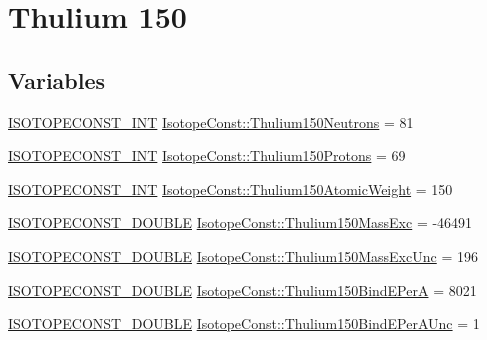 \hypertarget{group___isotope_const-_thulium-_tm150}{}\section{Thulium 150}
\label{group___isotope_const-_thulium-_tm150}
\subsection*{Variables}
\begin{DoxyCompactItemize}
\item 
\mbox{\hyperlink{group___isotope_const-_macros_ga5f18360b3e99483a35c32d789e62621c}{I\+S\+O\+T\+O\+P\+E\+C\+O\+N\+S\+T\+\_\+\+I\+NT}} \mbox{\hyperlink{group___isotope_const-_thulium-_tm150_ga7c480c8259281894e86acca334bd208d}{Isotope\+Const\+::\+Thulium150\+Neutrons}} = 81
\item 
\mbox{\hyperlink{group___isotope_const-_macros_ga5f18360b3e99483a35c32d789e62621c}{I\+S\+O\+T\+O\+P\+E\+C\+O\+N\+S\+T\+\_\+\+I\+NT}} \mbox{\hyperlink{group___isotope_const-_thulium-_tm150_gade3a193cf297667c1b759db4a148c9f4}{Isotope\+Const\+::\+Thulium150\+Protons}} = 69
\item 
\mbox{\hyperlink{group___isotope_const-_macros_ga5f18360b3e99483a35c32d789e62621c}{I\+S\+O\+T\+O\+P\+E\+C\+O\+N\+S\+T\+\_\+\+I\+NT}} \mbox{\hyperlink{group___isotope_const-_thulium-_tm150_ga3f472dc27a5a1fdf3734dee21bca418b}{Isotope\+Const\+::\+Thulium150\+Atomic\+Weight}} = 150
\item 
\mbox{\hyperlink{group___isotope_const-_macros_ga8f45a7272ce02c0b4c65c44636ed719a}{I\+S\+O\+T\+O\+P\+E\+C\+O\+N\+S\+T\+\_\+\+D\+O\+U\+B\+LE}} \mbox{\hyperlink{group___isotope_const-_thulium-_tm150_ga2db62b7aa86a179564244fd0c794fa7e}{Isotope\+Const\+::\+Thulium150\+Mass\+Exc}} = -\/46491
\item 
\mbox{\hyperlink{group___isotope_const-_macros_ga8f45a7272ce02c0b4c65c44636ed719a}{I\+S\+O\+T\+O\+P\+E\+C\+O\+N\+S\+T\+\_\+\+D\+O\+U\+B\+LE}} \mbox{\hyperlink{group___isotope_const-_thulium-_tm150_ga2979f6a14fbc955eb90e3735deb75d3a}{Isotope\+Const\+::\+Thulium150\+Mass\+Exc\+Unc}} = 196
\item 
\mbox{\hyperlink{group___isotope_const-_macros_ga8f45a7272ce02c0b4c65c44636ed719a}{I\+S\+O\+T\+O\+P\+E\+C\+O\+N\+S\+T\+\_\+\+D\+O\+U\+B\+LE}} \mbox{\hyperlink{group___isotope_const-_thulium-_tm150_gad3332180de13ae7e9e4c3cbd4411b1c3}{Isotope\+Const\+::\+Thulium150\+Bind\+E\+PerA}} = 8021
\item 
\mbox{\hyperlink{group___isotope_const-_macros_ga8f45a7272ce02c0b4c65c44636ed719a}{I\+S\+O\+T\+O\+P\+E\+C\+O\+N\+S\+T\+\_\+\+D\+O\+U\+B\+LE}} \mbox{\hyperlink{group___isotope_const-_thulium-_tm150_ga10dc2c2ee8cbeb21cbdb2323b869c9a1}{Isotope\+Const\+::\+Thulium150\+Bind\+E\+Per\+A\+Unc}} = 1

\end{DoxyCompactItemize}
